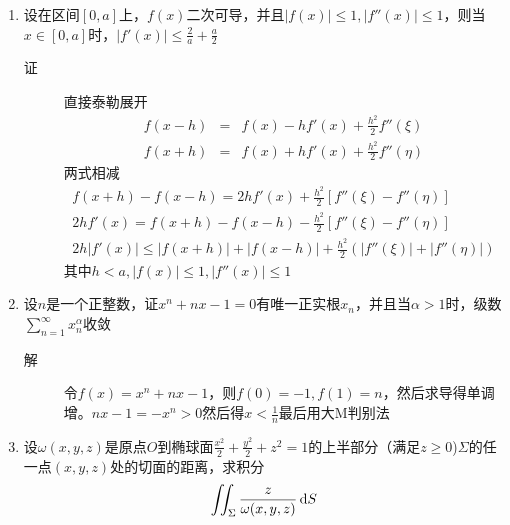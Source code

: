 \begin{enumerate}
\item 设在区间$[0,a]$上，$f(x)$二次可导，并且$|f(x)|\leq 1,|f''(x)|\leq 1$，则当$x\in [0,a]$时，$|f'(x)|\leq \frac{2}{a}+\frac{a}{2}$
\begin{description}
\item[证] 直接泰勒展开
\begin{eqnarray*}
f(x-h) &=& f(x)-hf'(x) +\frac{h^2}{2}f''(\xi)\\
f(x+h) &=& f(x)+hf'(x) +\frac{h^2}{2}f''(\eta)
\end{eqnarray*}
两式相减
\begin{eqnarray*}
f(x+h) - f(x-h) = 2hf'(x) +\frac{h^2}{2}[f''(\xi)-f''(\eta)]\\
2hf'(x) = f(x+h)- f(x-h) -\frac{h^2}{2}[f''(\xi)-f''(\eta)]\\
2h|f'(x)| \leq |f(x+h)|+ |f(x-h)| +\frac{h^2}{2}(|f''(\xi)|+|f''(\eta)|)
\end{eqnarray*}
其中$h<a,|f(x)|\leq 1,|f''(x)|\leq 1$
\end{description}

\item 设$n$是一个正整数，证$x^n+nx-1=0$有唯一正实根$x_n$，并且当$\alpha>1$时，级数$\sum_{n=1}^{\infty}x_n^{\alpha}$收敛
\begin{description}
\item[解] 令$f(x)=x^n+nx-1$，则$f(0)=-1,f(1)=n$，然后求导得单调增。$nx-1=-x^n>0$然后得$x<\frac{1}{n}$最后用大M判别法
\end{description}

\item 设$\omega(x,y,z)$是原点$O$到椭球面$\frac{x^2}{2}+\frac{y^2}{2}+z^2=1$的上半部分（满足$z\geq 0$)$\Sigma$的任一点$(x,y,z)$处的切面的距离，求积分
\[
\iint_{\Sigma}\frac{z}{\omega(x,y,z)}\,\mathrm{d} S
\]
































\end{enumerate}